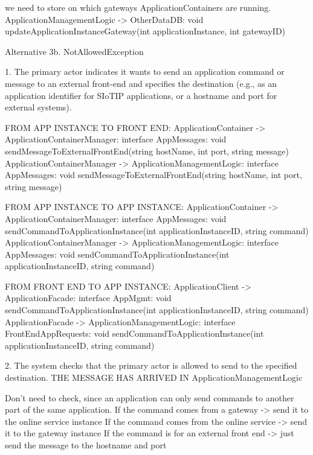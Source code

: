             we need to store on which gateways ApplicationContainers are running.
                ApplicationManagementLogic -> OtherDataDB: void updateApplicationInstanceGateway(int applicationInstance, int gatewayID)

           Alternative 3b. NotAllowedException

            1. The primary actor indicates it wants to send an application command or message to an external
               front-end and specifies the destination (e.g., as an application identifier for SIoTIP applications,
               or a hostname and port for external systems).

                FROM APP INSTANCE TO FRONT END:
                     ApplicationContainer -> ApplicationContainerManager: interface AppMessages: void sendMessageToExternalFrontEnd(string hostName, int port, string message)
                     ApplicationContainerManager -> ApplicationManagementLogic: interface AppMessages: void sendMessageToExternalFrontEnd(string hostName, int port, string message)

                FROM APP INSTANCE TO APP INSTANCE:
                     ApplicationContainer -> ApplicationContainerManager: interface AppMessages: void sendCommandToApplicationInstance(int applicationInstanceID, string command)
                     ApplicationContainerManager -> ApplicationManagementLogic: interface AppMessages: void sendCommandToApplicationInstance(int applicationInstanceID, string command)

                FROM FRONT END TO APP INSTANCE:
                    ApplicationClient -> ApplicationFacade: interface AppMgmt: void sendCommandToApplicationInstance(int applicationInstanceID, string command)
                    ApplicationFacade -> ApplicationManagementLogic: interface FrontEndAppRequests: void sendCommandToApplicationInstance(int applicationInstanceID, string command)

            2. The system checks that the primary actor is allowed to send to the specified destination.
                    THE MESSAGE HAS ARRIVED IN ApplicationManagementLogic

                    Don't need to check, since an application can only send commands to another part of the same application.
                    If the command comes from a gateway -> send it to the online service instance
                    If the command comes from the online service -> send it to the gateway instance
                    If the command is for an external front end -> just send the message to the hostname and port

